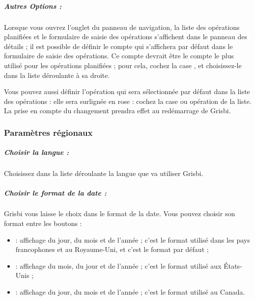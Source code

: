 \ifIllustration
\fi
%
%



\subparagraph{Autres Options :\label{setup-general-various-planned-otherOptions}}

Lorsque vous ouvrez l'onglet  du panneau de navigation, la liste des opérations planifiées et le formulaire de saisie des opérations  s'affichent dans le panneau des détails ; il est possible de définir le compte qui s'affichera par défaut dans le formulaire de saisie des opérations. Ce compte devrait être le compte le plus utilisé pour les opérations planifiées ; pour cela, cochez la case , et choisissez-le dans la liste déroulante à sa droite.


Vous pouvez aussi définir l’opération qui sera sélectionnée par défaut dans la liste des opérations : elle sera surlignée en rose{\couleur} : cochez la case  ou  opération de la liste. La prise en compte du changement prendra effet au redémarrage de Grisbi.



\subsubsection{Paramètres régionaux\label{setup-general-various-regional}}


\subparagraph{Choisir la langue :}\label{setup-general-various-regional-langue} Choisissez dans la liste déroulante la langue que va utiliser Grisbi.

\subparagraph{Choisir le format de la date :}\label{setup-general-localisation-date}

Grisbi vous laisse le choix dans le format de la date. Vous pouvez choisir son format entre les boutons :
\begin{itemize}
	\item {} : affichage du jour, du mois et de l'année ; c'est le format utilisé dans les pays francophones et au Royaume-Uni, et c'est le format par défaut ;    
	\item {} : affichage du mois, du jour et de l'année ; c'est le format utilisé aux États-Unis ;
	\item {} : affichage du jour, du mois et de l'année ; c'est le format utilisé au Canada.
\end{itemize}

